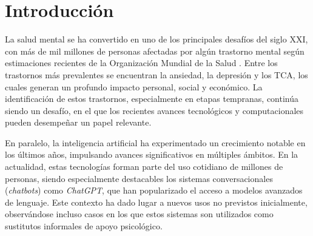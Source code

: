 % 
% 
% 
% 
% 
% 
% 
% 

\chapter{Introducción}
\label{cha:introduccion}

La salud mental se ha convertido en uno de los principales desafíos del siglo XXI, con más de mil millones de personas afectadas por algún trastorno mental según estimaciones recientes de la Organización Mundial de la Salud \cite{noauthor_over_nodate}. Entre los trastornos más prevalentes se encuentran la ansiedad, la depresión y los \ac{TCA}, los cuales generan un profundo impacto personal, social y económico. La identificación de estos trastornos, especialmente en etapas tempranas, continúa siendo un desafío, en el que los recientes avances tecnológicos y computacionales pueden desempeñar un papel relevante.

En paralelo, la inteligencia artificial ha experimentado un crecimiento notable en los últimos años, impulsando avances significativos en múltiples ámbitos. En la actualidad, estas tecnologías forman parte del uso cotidiano de millones de personas, siendo especialmente destacables los sistemas conversacionales (\textit{chatbots}) como \textit{ChatGPT}, que han popularizado el acceso a modelos avanzados de lenguaje. Este contexto ha dado lugar a nuevos usos no previstos inicialmente, observándose incluso casos en los que estos sistemas son utilizados como sustitutos informales de apoyo psicológico.

